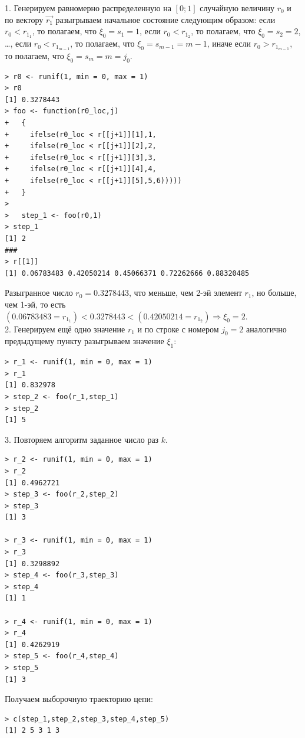 \documentclass[14pt,a4paper]{scrartcl}
\begin{document}
1. Генерируем равномерно распределенную на $[0;1]$ случайную величину $r_0$ и по вектору $\vec{r_1}$ разыгрываем начальное состояние следующим образом: если $r_0 < r_{1_1}$, то полагаем, что $\xi_0 = s_1 = 1$, если $r_0 < r_{1_2}$, то полагаем, что $\xi_0 = s_2 = 2$, \ldots, если $r_0 < r_{1_{m-1}}$, то полагаем, что $\xi_0 = s_{m-1} = m-1$, иначе если $r_0 > r_{1_{m-1}}$, то полагаем, что $\xi_0 = s_{m} = m = j_0$.


\begin{verbatim}
> r0 <- runif(1, min = 0, max = 1)
> r0
[1] 0.3278443
> foo <- function(r0_loc,j)
+   {
+     ifelse(r0_loc < r[[j+1]][1],1,
+     ifelse(r0_loc < r[[j+1]][2],2,
+     ifelse(r0_loc < r[[j+1]][3],3,
+     ifelse(r0_loc < r[[j+1]][4],4,
+     ifelse(r0_loc < r[[j+1]][5],5,6)))))
+   }
>   
>   step_1 <- foo(r0,1)
> step_1
[1] 2
###
> r[[1]]
[1] 0.06783483 0.42050214 0.45066371 0.72262666 0.88320485
\end{verbatim}

Разыгранное число $r_0 = 0.3278443$, что меньше, чем 2-эй элемент $r_1$, но больше, чем 1-эй, то есть $(0.06783483 = r_{1_1}) < 0.3278443 < (0.42050214 = r_{1_2})  \Rightarrow \xi_0 = 2$. \\

2. Генерируем ещё одно значение $r_1$ и по строке с номером $j_0 = 2$ аналогично предыдущему пункту разыгрываем значение $\xi_1:$

\begin{verbatim}
> r_1 <- runif(1, min = 0, max = 1)
> r_1
[1] 0.832978
> step_2 <- foo(r_1,step_1)
> step_2
[1] 5
\end{verbatim}

3. Повторяем алгоритм  заданное число раз $k$.

\begin{verbatim}
> r_2 <- runif(1, min = 0, max = 1)
> r_2
[1] 0.4962721
> step_3 <- foo(r_2,step_2)
> step_3
[1] 3

> r_3 <- runif(1, min = 0, max = 1)
> r_3
[1] 0.3298892
> step_4 <- foo(r_3,step_3)
> step_4
[1] 1

> r_4 <- runif(1, min = 0, max = 1)
> r_4
[1] 0.4262919
> step_5 <- foo(r_4,step_4)
> step_5
[1] 3
\end{verbatim}

Получаем выборочную траекторию цепи:

\begin{verbatim}
> c(step_1,step_2,step_3,step_4,step_5)
[1] 2 5 3 1 3
\end{verbatim}
	
\end{document}
